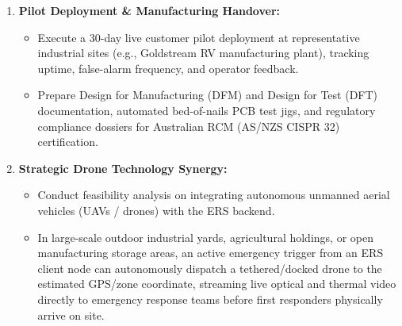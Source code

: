 \begin{enumerate}
    \item \textbf{Pilot Deployment \& Manufacturing Handover:}
    \begin{itemize}
        \item Execute a 30-day live customer pilot deployment at representative industrial sites (e.g., Goldstream RV manufacturing plant), tracking uptime, false-alarm frequency, and operator feedback.
        \item Prepare Design for Manufacturing (DFM) and Design for Test (DFT) documentation, automated bed-of-nails PCB test jigs, and regulatory compliance dossiers for Australian RCM (AS/NZS CISPR 32) certification.
    \end{itemize}

    \item \textbf{Strategic Drone Technology Synergy:}
    \begin{itemize}
        \item Conduct feasibility analysis on integrating autonomous unmanned aerial vehicles (UAVs / drones) with the ERS backend.
        \item In large-scale outdoor industrial yards, agricultural holdings, or open manufacturing storage areas, an active emergency trigger from an ERS client node can autonomously dispatch a tethered/docked drone to the estimated GPS/zone coordinate, streaming live optical and thermal video directly to emergency response teams before first responders physically arrive on site.
    \end{itemize}
\end{enumerate}

